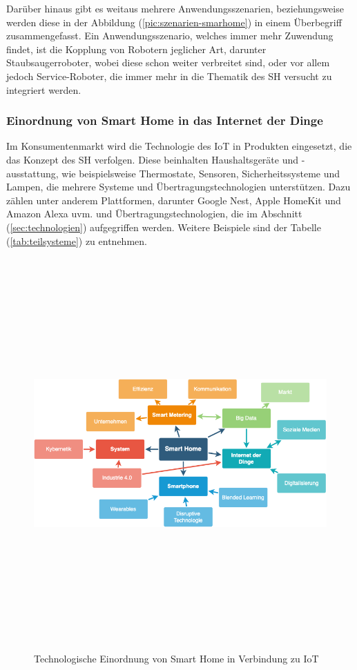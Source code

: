         Darüber hinaus gibt es weitaus mehrere Anwendungsszenarien, beziehungsweise werden diese in der Abbildung 
        (\ref{pic:szenarien-smarhome}) in einem Überbegriff zusammengefasst.
        Ein Anwendungsszenario, welches immer mehr Zuwendung findet, ist die Kopplung 
        von Robotern jeglicher Art, darunter Staubsaugerroboter, wobei diese schon weiter verbreitet sind, oder 
        vor allem jedoch Service-Roboter, die immer mehr in die Thematik des \acl{SH} versucht zu integriert werden. 
        
    \subsubsection*{Einordnung von Smart Home in das Internet der Dinge}
    \label{subsubsec:smartHome-IoT}
        Im Konsumentenmarkt wird die Technologie des \acs{IoT} in Produkten eingesetzt, die 
        das Konzept des \acl{SH} verfolgen.  
        Diese beinhalten Haushaltsgeräte und -ausstattung, wie beispielsweise Thermostate, Sensoren, 
        Sicherheitssysteme und Lampen, die mehrere Systeme und Übertragungstechnologien 
        unterstützen. Dazu zählen unter anderem Plattformen, darunter Google Nest, Apple HomeKit 
        und Amazon Alexa uvm. und Übertragungstechnologien, die im Abschnitt (\ref{sec:technologien}) 
        aufgegriffen werden.
        Weitere Beispiele sind der Tabelle (\ref{tab:teilsysteme}) zu entnehmen. 
        \begin{figure}[hbt!]
            \centering
            \includegraphics[width=15cm,height=15cm,keepaspectratio]{images/SH-Mind_Map.png}
            \caption{Technologische Einordnung von Smart Home in Verbindung zu IoT \cite{shmindmap2021}}
            \label{pic:mindmap_SH-IoT}
        \end{figure}
